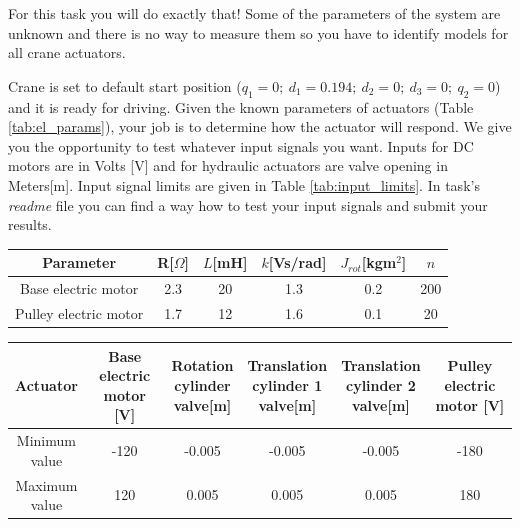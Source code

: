 \documentclass{article}
\begin{document}
	For this task you will do exactly that! Some of the parameters of the system are unknown and there is no way to measure them so you have to identify models for all crane actuators.
	
	Crane is set to default start position ($q_1 = 0; \ d_1 = 0.194; \  d_2 = 0; \  d_3 = 0; \  q_2 = 0$) and it is ready for driving. Given the known parameters of actuators (Table \ref{tab:el_params}), your job is to determine how the actuator will respond. We give you the opportunity to test whatever input signals you want.
	Inputs for DC motors are in Volts [V] and for hydraulic actuators are valve opening in Meters[m]. Input signal limits are given in Table \ref{tab:input_limits}.  In task's \textit{readme} file you can find a way how to test your input signals and submit your results.
	
	\begin{center}
		\label{tab:el_params}
		\begin{tabular}{|| c || c c c c c||}
			\hline
			Parameter & R[$\Omega$] & $L$[mH] & $k$[Vs/rad] & $J_{rot}$[kgm$^2$] & 
			$n$\\
			\hline\hline
			Base electric motor & 2.3 & 20 & 1.3 & 0.2 & 200\\ 
			\hline
			Pulley electric motor & 1.7 & 12 & 1.6 & 0.1 & 20\\
			\hline
		\end{tabular}
	\end{center}
	
	\begin{center}
		
		\label{tab:input_limits}
		\begin{tabular}{|| c || c c c c c ||}
			\hline
			Actuator & \makecell{Base electric \\ motor [V]} & \makecell{Rotation \\ cylinder \\ valve[m]} & \makecell{Translation \\ cylinder 1 \\ valve[m]} & \makecell{Translation \\ cylinder 2 \\ valve[m]} &  \makecell{Pulley electric \\ motor [V]}\\
			\hline\hline
			\makecell{Minimum \\ value} & -120 & -0.005 & -0.005 & -0.005 & -180 \\ 
			\hline
			\makecell{Maximum\\ value} & 120 & 0.005 & 0.005 & 0.005 & 180 \\ 
			\hline
		\end{tabular}
	\end{center}
	
\end{document}
